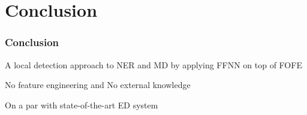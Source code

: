 \documentclass{beamer}
\begin{document}



\section{Conclusion}
\begin{frame}
\frametitle{Conclusion}
\begin{block}{}
	A local detection approach to NER and MD by applying FFNN on top of FOFE
\end{block}
\begin{block}{}
	No feature engineering and No external knowledge
\end{block}
\begin{block}{}
	On a par with state-of-the-art ED system
\end{block}
\end{frame}
\end{document}
